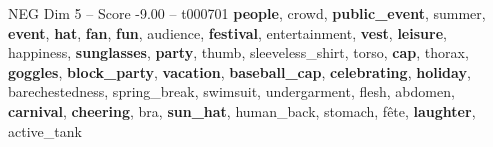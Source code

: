 \begin{textsample}{NEG Dim 5 – Score -9.00 – t000701}  \label{ex:f5_neg_005}
\textbf{people}, crowd, \textbf{public\_event}, summer, \textbf{event}, \textbf{hat}, \textbf{fan}, \textbf{fun}, audience, \textbf{festival}, entertainment, \textbf{vest}, \textbf{leisure}, happiness, \textbf{sunglasses}, \textbf{party}, thumb, sleeveless\_shirt, torso, \textbf{cap}, thorax, \textbf{goggles}, \textbf{block\_party}, \textbf{vacation}, \textbf{baseball\_cap}, \textbf{celebrating}, \textbf{holiday}, barechestedness, spring\_break, swimsuit, undergarment, flesh, abdomen, \textbf{carnival}, \textbf{cheering}, bra, \textbf{sun\_hat}, human\_back, stomach, fête, \textbf{laughter}, active\_tank

\end{textsample}

